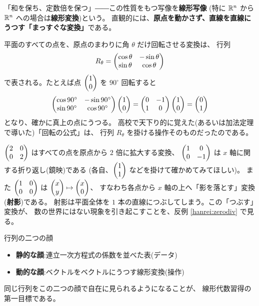 「和を保ち、定数倍を保つ」――この性質をもつ写像を\textbf{線形写像}
(特に $\mathbb{R}^n$ から $\mathbb{R}^n$ への場合は\textbf{線形変換})という。
直観的には、\textbf{原点を動かさず、直線を直線にうつす「まっすぐな変換」}である。

\begin{rei}[平面の回転]
平面のすべての点を、原点のまわりに角 $\theta$ だけ回転させる変換は、
行列
\[
R_\theta = \begin{pmatrix}\cos\theta & -\sin\theta \\ \sin\theta & \cos\theta\end{pmatrix}
\]
で表される。たとえば点 $\begin{pmatrix}1 \\ 0\end{pmatrix}$ を $90^\circ$ 回転すると
\[
\begin{pmatrix}\cos 90^\circ & -\sin 90^\circ \\ \sin 90^\circ & \cos 90^\circ\end{pmatrix}
\begin{pmatrix}1 \\ 0\end{pmatrix}
= \begin{pmatrix}0 & -1 \\ 1 & 0\end{pmatrix}\begin{pmatrix}1 \\ 0\end{pmatrix} = \begin{pmatrix}0 \\ 1\end{pmatrix}
\]
となり、確かに真上の点にうつる。
高校で天下り的に覚えた(あるいは加法定理で導いた)「回転の公式」は、
行列 $R_\theta$ を掛ける操作そのものだったのである。
\end{rei}

\begin{rei}[拡大・鏡映・射影]
$\begin{pmatrix}2 & 0 \\ 0 & 2\end{pmatrix}$ はすべての点を原点から $2$ 倍に拡大する変換、
$\begin{pmatrix}1 & 0 \\ 0 & -1\end{pmatrix}$ は $x$ 軸に関する折り返し(鏡映)である
(各自、$\begin{pmatrix}1 \\ 1\end{pmatrix}$ などを掛けて確かめてみてほしい)。
また $\begin{pmatrix}1 & 0 \\ 0 & 0\end{pmatrix}$ は $\begin{pmatrix}x \\ y\end{pmatrix} \mapsto \begin{pmatrix}x \\ 0\end{pmatrix}$、
すなわち各点から $x$ 軸の上へ「影を落とす」変換(\textbf{射影})である。
射影は平面全体を $1$ 本の直線につぶしてしまう。この「つぶす」変換が、
数の世界にはない現象を引き起こすことを、反例 \ref{hanrei:zerodiv} で見る。
\end{rei}

\begin{itembox}[l]{行列の二つの顔}
\begin{itemize}
\item \textbf{静的な顔}:連立一次方程式の係数を並べた表(データ)
\item \textbf{動的な顔}:ベクトルをベクトルにうつす線形変換(操作)
\end{itemize}
同じ行列をこの二つの顔で自在に見られるようになることが、
線形代数習得の第一目標である。
\end{itembox}

